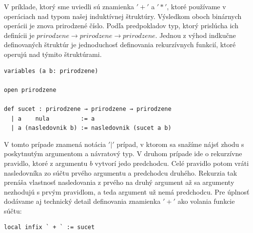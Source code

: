 \documentclass[a4paper,10pt,oneside]{report}%
\begin{document}
    V príklade, ktorý sme uviedli sú znamienka $'+'$ a $'*'$, ktoré používame
v operáciach nad typom našej induktívnej štruktúry.
    Výsledkom oboch binárnych operácii je znova prirodzené číslo.
    Podľa predpokladov typ, ktorý prislúcha ich definícii je
$prirodzene \to prirodzene \to prirodzene$.
    Jednou z výhod indkučne definovaných štruktúr je jednoduchosť definovania
rekurzívnych funkcií, ktoré operujú nad týmito štruktúrami.
\begin{lstlisting}
variables (a b: prirodzene)

open prirodzene

def sucet : prirodzene → prirodzene → prirodzene
  | a    nula         := a
  | a (nasledovnik b) := nasledovnik (sucet a b)
\end{lstlisting}
    V tomto prípade znamená notácia $'|'$ prípad, v ktorom sa snažíme nájsť zhodu
s poskytnutým argumentom a návratový typ.
    V druhom prípade ide o rekurzívne pravidlo, ktoré z argumentu $b$ vytvorí jedo
predchodcu.
    Celé pravidlo potom vráti nasledovníka zo súčtu prvého argumentu a predchodcu
druhého.
    Rekurzia tak prenáša vlastnosť nasledovania z prvého na druhý argument až
sa argumenty nezhodujú s prvým pravidlom, a teda argument už nemá predchodcu.
    Pre úplnosť dodávame aj technický detail definovania znamienka $'+'$ ako volania
funkcie súčtu:
\begin{lstlisting}
local infix ` + ` := sucet
\end{lstlisting}
\end{document}
